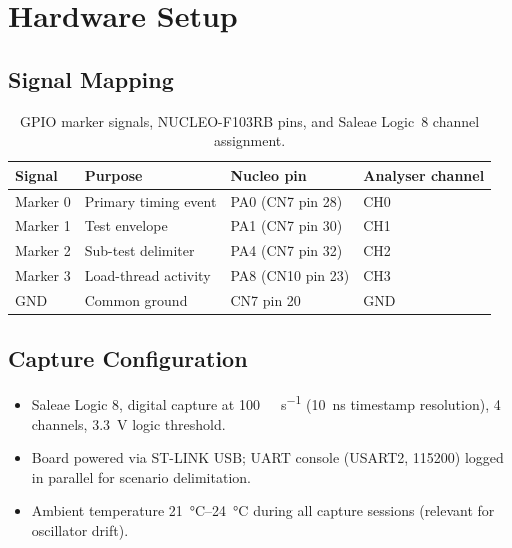 \chapter{Hardware Setup}
\label{app:hardware}

\section{Signal Mapping}

\begin{table}[hb]
  \centering
  \caption[GPIO marker to logic-analyser mapping]{GPIO marker signals,
    NUCLEO-F103RB pins, and Saleae Logic~8 channel assignment.}
  \label{tab:pinmap}
  \small
  \begin{tabular}{@{}llll@{}}
    \toprule
    Signal & Purpose & Nucleo pin & Analyser channel \\
    \midrule
    Marker 0 & Primary timing event    & PA0 (CN7 pin 28)  & CH0 \\
    Marker 1 & Test envelope           & PA1 (CN7 pin 30)  & CH1 \\
    Marker 2 & Sub-test delimiter      & PA4 (CN7 pin 32)  & CH2 \\
    Marker 3 & Load-thread activity    & PA8 (CN10 pin 23) & CH3 \\
    GND      & Common ground           & CN7 pin 20        & GND \\
    \bottomrule
  \end{tabular}
\end{table}

\section{Capture Configuration}

\begin{itemize}
  \item Saleae Logic 8, digital capture at \SI{100}{\mega\sample\per\second}
        (\SI{10}{\nano\second} timestamp resolution), 4 channels,
        \SI{3.3}{\volt} logic threshold.
  \item Board powered via ST-LINK USB; UART console (USART2,
        \SI{115200}{\baud}) logged in parallel for scenario
        delimitation.
  \item Ambient temperature \SIrange{21}{24}{\degreeCelsius} during all
        capture sessions (relevant for oscillator drift).
\end{itemize}
